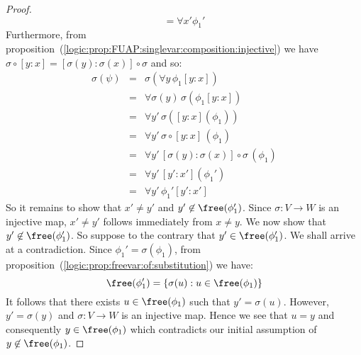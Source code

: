 \begin{proof}
\[        =\forall x'\phi_{1}'
    \]
Furthermore, from
proposition~(\ref{logic:prop:FUAP:singlevar:composition:injective})
we have $\sigma\circ[y\!:\!x]=[\sigma(y)\!:\!\sigma(x)]\circ\sigma$
and so:
    \begin{eqnarray*}
    \sigma(\psi)&=&\sigma(\forall y\,\phi_{1}[y\!:\!x])\\
    &=&\forall\sigma(y)\,\sigma(\phi_{1}[y\!:\!x])\\
    &=&\forall y'\,\sigma([y\!:\!x](\phi_{1}))\\
    &=&\forall y'\,\sigma\circ [y\!:\!x]\,(\phi_{1})\\
    &=&\forall y'\, [\sigma(y)\!:\!\sigma(x)]\circ\sigma\,(\phi_{1})\\
    &=&\forall y'\,[y'\!:\!x'](\phi_{1}')\\
    &=&\forall y'\,\phi_{1}'[y'\!:\!x']
    \end{eqnarray*}
So it remains to show that $x'\neq y'$ and
$y'\not\in\free(\phi_{1}')$. Since $\sigma:V\to W$ is an injective
map, $x'\neq y'$ follows immediately from $x\neq y$. We now show
that $y'\not\in\free(\phi_{1}')$. So suppose to the contrary that
$y'\in\free(\phi_{1}')$. We shall arrive at a contradiction. Since
$\phi_{1}'=\sigma(\phi_{1})$, from
proposition~(\ref{logic:prop:freevar:of:substitution}) we have:
 \[ \free(\phi_{1}')=\{\sigma(u):u\in\free(\phi_{1})\}
 \]
It follows that there exists $u\in\free(\phi_{1})$ such that
$y'=\sigma(u)$. However, $y'=\sigma(y)$ and $\sigma:V\to W$ is an
injective map. Hence we see that $u=y$ and consequently
$y\in\free(\phi_{1})$ which contradicts our initial assumption of
$y\not\in\free(\phi_{1})$.
\end{proof}

